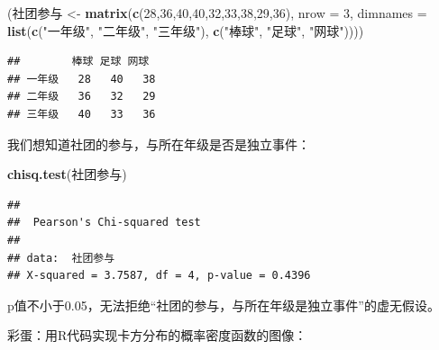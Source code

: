 \documentclass[]{book}
\newenvironment{Shaded}{\begin{snugshade}}{\end{snugshade}}
\newcommand{\DataTypeTok}[1]{\textcolor[rgb]{0.13,0.29,0.53}{#1}}
\newcommand{\DecValTok}[1]{\textcolor[rgb]{0.00,0.00,0.81}{#1}}
\newcommand{\KeywordTok}[1]{\textcolor[rgb]{0.13,0.29,0.53}{\textbf{#1}}}
\newcommand{\NormalTok}[1]{#1}
\newcommand{\StringTok}[1]{\textcolor[rgb]{0.31,0.60,0.02}{#1}}
\begin{document}
\begin{Shaded}
\begin{Highlighting}[]
\NormalTok{(社团参与 <-}\StringTok{ }\KeywordTok{matrix}\NormalTok{(}\KeywordTok{c}\NormalTok{(}\DecValTok{28}\NormalTok{,}\DecValTok{36}\NormalTok{,}\DecValTok{40}\NormalTok{,}\DecValTok{40}\NormalTok{,}\DecValTok{32}\NormalTok{,}\DecValTok{33}\NormalTok{,}\DecValTok{38}\NormalTok{,}\DecValTok{29}\NormalTok{,}\DecValTok{36}\NormalTok{), }\DataTypeTok{nrow =} \DecValTok{3}\NormalTok{, }\DataTypeTok{dimnames =} \KeywordTok{list}\NormalTok{(}\KeywordTok{c}\NormalTok{(}\StringTok{"一年级"}\NormalTok{, }\StringTok{"二年级"}\NormalTok{, }\StringTok{"三年级"}\NormalTok{), }\KeywordTok{c}\NormalTok{(}\StringTok{"棒球"}\NormalTok{, }\StringTok{"足球"}\NormalTok{, }\StringTok{"网球"}\NormalTok{))))}
\end{Highlighting}
\end{Shaded}

\begin{verbatim}
##        棒球 足球 网球
## 一年级   28   40   38
## 二年级   36   32   29
## 三年级   40   33   36
\end{verbatim}

我们想知道社团的参与，与所在年级是否是独立事件：

\begin{Shaded}
\begin{Highlighting}[]
\KeywordTok{chisq.test}\NormalTok{(社团参与)}
\end{Highlighting}
\end{Shaded}

\begin{verbatim}
## 
##  Pearson's Chi-squared test
## 
## data:  社团参与
## X-squared = 3.7587, df = 4, p-value = 0.4396
\end{verbatim}

p值不小于0.05，无法拒绝``社团的参与，与所在年级是独立事件''的虚无假设。

彩蛋：用R代码实现卡方分布的概率密度函数的图像：
\end{document}
